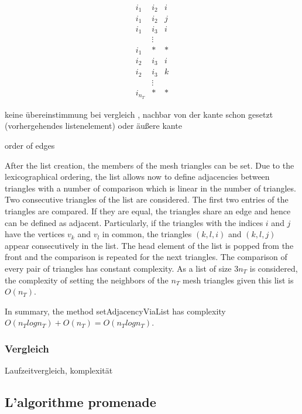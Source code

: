 \documentclass[10pt]{article}
\begin{document}
\begin{equation*}
\begin{matrix}
i_1 & i_2 & i \\
i_1 & i_2 & j \\
i_1 & i_3 & i \\
& \vdots & \\
i_1 & * & * \\
i_2 & i_3 & i \\
i_2 & i_3 & k \\
& \vdots & \\
i_{n_T} & * & * 
\end{matrix}
\end{equation*}

keine übereinstimmung bei vergleich , nachbar von der kante schon gesetzt (vorhergehendes listenelement) oder äußere kante

order of edges

After the list creation, the members of the mesh triangles can be set. Due to the lexicographical ordering, the list allows now to define adjacencies between triangles with a number of comparison which is linear in the number of triangles. Two consecutive triangles of the list are considered. The first two entries of the triangles are compared. If they are equal, the triangles share an edge and hence can be defined as adjacent. Particularly, if the triangles with the indices $i$ and $j$ have the vertices $v_k$ and $v_l$ in common, the triangles $({k},{l},i)$ and $({k},{l},j)$ appear consecutively in the list. The head element of the list is popped from the front and the comparison is repeated for the next triangles. The comparison of every pair of triangles has constant complexity. As a list of size $3 n_T$ is considered, the complexity of setting the neighbors of the $n_T$ mesh triangles given this list is $O(n_T)$.

In summary, the method setAdjacencyViaList has complexity $O(n_Tlogn_T) + O(n_T) = O(n_Tlogn_T)$.

\subsubsection{Vergleich}

Laufzeitvergleich, komplexität

\subsection{L'algorithme promenade} \label{promenade}
\end{document}
